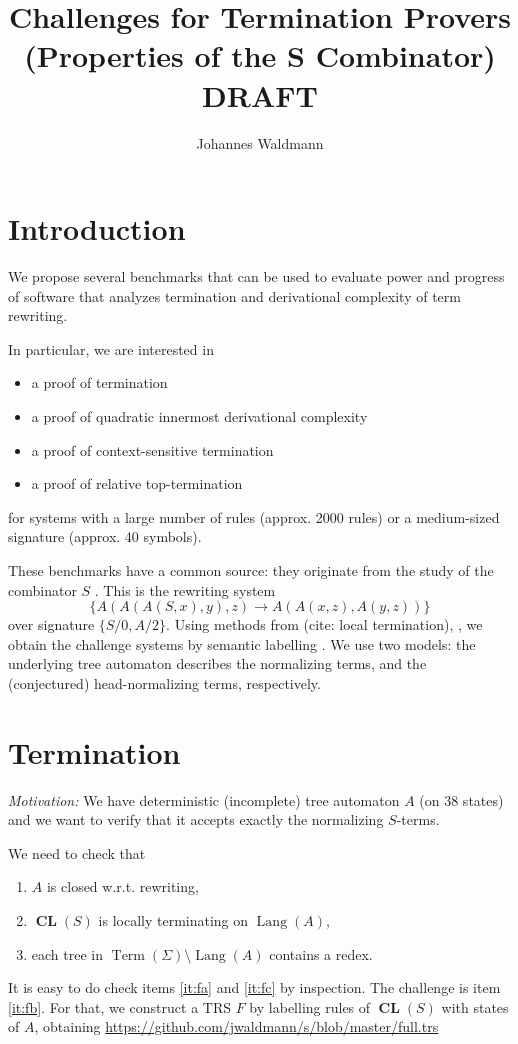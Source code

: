 \documentclass[12pt]{article}
\title{Challenges for Termination Provers \\
  (Properties of the S Combinator) \\
  DRAFT
}
\author{Johannes Waldmann}
\newcommand{\CL}{\operatorname{\textbf{CL}}}
\newcommand{\Term}{\operatorname{Term}}
\newcommand{\Lang}{\operatorname{Lang}}
\begin{document}
\maketitle

\section{Introduction}

We propose several benchmarks
that can be used to evaluate power and progress
of software that analyzes termination 
and derivational complexity of term rewriting.

In particular, we are interested in
\begin{itemize}
\item a proof of termination
\item a proof of quadratic innermost derivational complexity
\item a proof of context-sensitive termination
\item a proof of relative top-termination
\end{itemize}
for systems with a large number of rules (approx. 2000 rules)
or a medium-sized signature (approx. 40 symbols).

These benchmarks have a common source: 
they originate from the study of the combinator $S$
\cite{DBLP:journals/iandc/Waldmann00}.
This is the rewriting system 
\[ \{ A(A(A(S,x),y),z)\to A(A(x,z),A(y,z)) \} \]
over signature $\{S/0, A/2\}$.
Using methods from (cite: local termination),
\cite{DBLP:journals/corr/abs-1006-4955},
we obtain the challenge systems by semantic labelling
\cite{DBLP:journals/fuin/Zantema95}.
We use two models: the underlying tree automaton
describes the normalizing terms, 
and the (conjectured) head-normalizing terms, respectively.


\section{Termination}

\emph{Motivation:}
We have deterministic (incomplete) tree automaton $A$
(on 38 states)
and we want to verify that it accepts exactly 
the normalizing $S$-terms.

We need to check that 
\begin{enumerate}
\item \label{it:fa} 
  $A$ is closed w.r.t. rewriting,
\item \label{it:fb} 
  $\CL(S)$ is locally terminating on $\Lang(A)$,
\item \label{it:fc} 
  each tree in $\Term(\Sigma)\setminus\Lang(A)$
  contains a redex.
\end{enumerate}
It is easy to do check items \ref{it:fa} and \ref{it:fc}
by inspection. The challenge is item \ref{it:fb}.
For that, we construct a TRS $F$ 
by labelling rules of $\CL(S)$ with states of $A$, obtaining
\url{https://github.com/jwaldmann/s/blob/master/full.trs}
\end{document}
